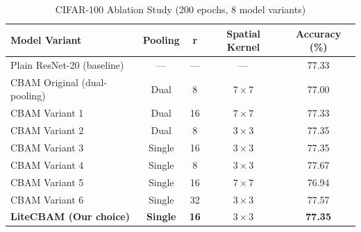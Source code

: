 \begin{table}[ht]
\centering
\caption{CIFAR-100 Ablation Study (200 epochs, 8 model variants)}
\label{tab:ablation}
\begin{tabular}{lcccc}
\toprule
\textbf{Model Variant} & \textbf{Pooling} & \textbf{r} & \textbf{Spatial Kernel} & \textbf{Accuracy (\%)} \\
\midrule
Plain ResNet-20 (baseline) & — & — & — & 77.33 \\
CBAM Original (dual-pooling) & Dual & 8 & $7\times7$ & 77.00 \\
CBAM Variant 1 & Dual & 16 & $7\times7$ & 77.33 \\
CBAM Variant 2 & Dual & 8 & $3\times3$ & 77.35 \\
CBAM Variant 3 & Single & 16 & $3\times3$ & 77.35 \\
CBAM Variant 4 & Single & 8 & $3\times3$ & 77.67 \\
CBAM Variant 5 & Single & 16 & $7\times7$ & 76.94 \\
CBAM Variant 6 & Single & 32 & $3\times3$ & 77.57 \\
\midrule
\textbf{LiteCBAM (Our choice)} & \textbf{Single} & \textbf{16} & \textbf{$3\times3$} & \textbf{77.35} \\
\bottomrule
\end{tabular}
\end{table}
